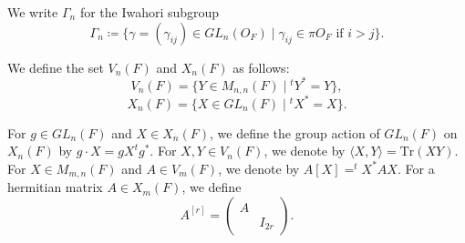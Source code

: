 \documentclass[11pt,oneside]{amsart}
\theoremstyle{plain}
\theoremstyle{definition}
\theoremstyle{remark}
\numberwithin{equation}{section}
\begin{document}
	We write $\Gamma_{n}$ for the Iwahori subgroup
	\begin{equation*}
		\Gamma_{n}\coloneqq \lbrace \gamma=(\gamma_{ij}) \in GL_{n}(O_{F}) \mid \gamma_{ij} \in \pi O_{F} \text{ if }i>j \rbrace.
	\end{equation*}
	
	We define the set $V_{n}(F)$ and $X_{n}(F)$ as follows:
	\begin{equation*}
		V_{n}(F)=\lbrace Y \in M_{n,n}(F) \mid \text{}^tY^*=Y \rbrace,
	\end{equation*}
	\begin{equation*}
		X_{n}(F)=\lbrace X \in GL_{n}(F) \mid \text{}^tX^*=X \rbrace.
	\end{equation*}
	
	For $g \in GL_{n}(F)$ and $X \in X_{n}(F)$, we define the group action of $GL_{n}(F)$ on $X_{n}(F)$ by $g \cdot X=gX^tg^*$. For $X, Y \in V_{n}(F)$, we denote by $\langle X,Y \rangle=\mathrm{Tr}(XY)$. For $X \in M_{m,n}(F)$ and $A \in V_{m}(F)$, we denote by $A[X]=^tX^*AX.$ For a hermitian matrix $A \in X_m(F)$, we define
	\begin{equation*} A^{[r]}=\left(\begin{array}{cc} A & \\ & I_{2r} \end{array}\right).\end{equation*}
	
\end{document}
